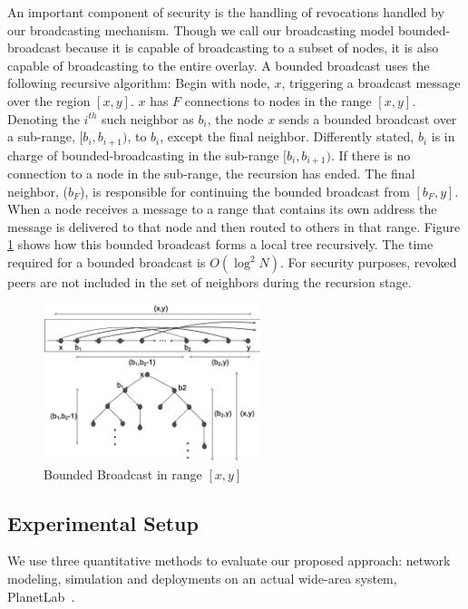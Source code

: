 \documentclass[conference]{IEEEtran}
\begin{document}
An important component of security is the handling of revocations handled by our
broadcasting mechanism.  Though we call our broadcasting model bounded-broadcast
because it is capable of broadcasting to a subset of nodes, it is also capable
of broadcasting to the entire overlay.  A bounded broadcast uses the following
recursive algorithm:  Begin with node, $x$, triggering a broadcast message over
the region $[x, y]$.  $x$ has $F$ connections to nodes in the range $[x, y]$.
Denoting the $i^{th}$ such neighbor as $b_i$, the node $x$ sends a bounded
broadcast over a sub-range, $[b_i, b_{i+1})$, to $b_i$, except the final
neighbor.  Differently stated, $b_i$ is in charge of bounded-broadcasting 
in the sub-range $[b_i, b_{i+1})$. If there is no connection to a node in the
sub-range, the recursion has ended.  The final neighbor, ($b_F$), is responsible
for continuing the bounded broadcast from $[b_F, y]$.  When a node receives a
message to a range that contains its own address the message is delivered to
that node and then routed to others in that range.  Figure \ref{fig:tree} shows
how this bounded broadcast forms a local tree recursively.   The time required
for a bounded broadcast is $O(\log^2 N)$.  For security purposes, revoked peers
are not included in the set of neighbors during the recursion stage.

\begin{figure}[!h]
\centering
\includegraphics[width=2.5in]{tree}
\caption{Bounded Broadcast in range $[x, y]$}
\label{fig:tree}
\end{figure}

\subsection{Experimental Setup}
We use three quantitative methods to evaluate our proposed approach: network
modeling, simulation and deployments on an actual wide-area system,
PlanetLab~\cite{planetlab}.
\end{document}
